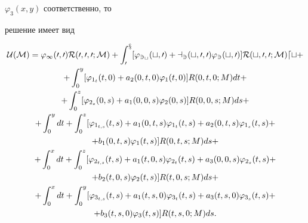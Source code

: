 $\varphi_3(x,y)$ соответственно, то 


решение имеет вид 


\begin{gather*} 


\U(M)=\varphi_1(0,0)R(0,0,0;M)+\int^x_0[\varphi_{3_t}(t,0) 


+a_3(t,0,0)\varphi_3(t,0)] 


R(t,0,0;M)dt+ \\ 


% 


+\int^y_0[\varphi_{1_t}(t,0)+a_2(0,t,0)\varphi_1(t,0)] 


R(0,t,0;M)dt +\\ 


+\int^z_0[\varphi_{2_s}(0,s)+a_1(0,0,s)\varphi_2(0,s)] 


R(0,0,s;M)ds+ \\ 


% 


+\int^y_0 dt+\int^z_0[\varphi_{1_{t,s}}(t,s)+a_1(0,t,s) 


\varphi_{1_t}(t,s)+a_2(0,t,s)\varphi_{1_s}(t,s)+\\ 


% 


+b_1(0,t,s)\varphi_1(t,s)]R(0,t,s;M)ds+ \\ 


% 


+\int^x_0 dt+\int^z_0[\varphi_{2_{t,s}}(t,s)+a_1(t,0,s) 


\varphi_{2_t}(t,s)+a_3(0,0,s)\varphi_{2_s}(t,s)+\\ 


% 


+b_2(t,0,s)\varphi_2(t,s)]R(t,0,s;M)ds + \\%


+\int^x_0 dt+\int^y_0[\varphi_{3_{t,s}}(t,s)+a_1(t,s,0) 


\varphi_{3_t}(t,s)+a_3(t,s,0)\varphi_{3_s}(t,s)+\\ 


% 


+b_3(t,s,0)\varphi_3(t,s)]R(t,s,0;M)ds.\end{gather*} 


 


